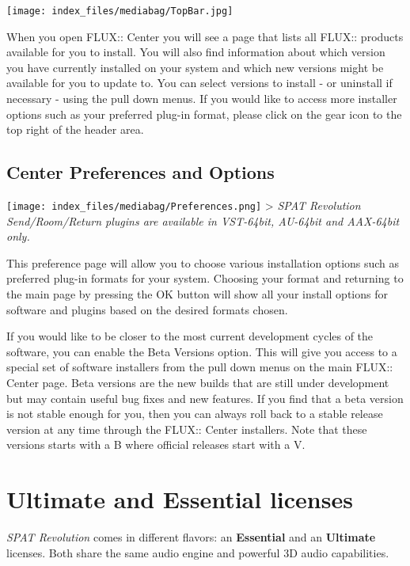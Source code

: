 \documentclass[
  letterpaper,
  DIV=11,
  numbers=noendperiod]{scrreport}
\begin{document}
\texttt{[image: index\_files/mediabag/TopBar.jpg]}

When you open FLUX:: Center you will see a page that lists all FLUX::
products available for you to install. You will also find information
about which version you have currently installed on your system and
which new versions might be available for you to update to. You can
select versions to install - or uninstall if necessary - using the pull
down menus. If you would like to access more installer options such as
your preferred plug-in format, please click on the gear icon to the top
right of the header area.

\hypertarget{center-preferences-and-options}{%
\section{Center Preferences and
Options}\label{center-preferences-and-options}}

\texttt{[image: index\_files/mediabag/Preferences.png]} \textgreater{}
\emph{\emph{SPAT Revolution} Send/Room/Return plugins are available in
VST-64bit, AU-64bit and AAX-64bit only.}

This preference page will allow you to choose various installation
options such as preferred plug-in formats for your system. Choosing your
format and returning to the main page by pressing the OK button will
show all your install options for software and plugins based on the
desired formats chosen.

If you would like to be closer to the most current development cycles of
the software, you can enable the Beta Versions option. This will give
you access to a special set of software installers from the pull down
menus on the main FLUX:: Center page. Beta versions are the new builds
that are still under development but may contain useful bug fixes and
new features. If you find that a beta version is not stable enough for
you, then you can always roll back to a stable release version at any
time through the FLUX:: Center installers. Note that these versions
starts with a B where official releases start with a V.

\hypertarget{ultimate-and-essential-licenses}{%
\chapter{Ultimate and Essential
licenses}\label{ultimate-and-essential-licenses}}

\emph{SPAT Revolution} comes in different flavors: an \textbf{Essential}
and an \textbf{Ultimate} licenses. Both share the same audio engine and
powerful 3D audio capabilities.
\end{document}
